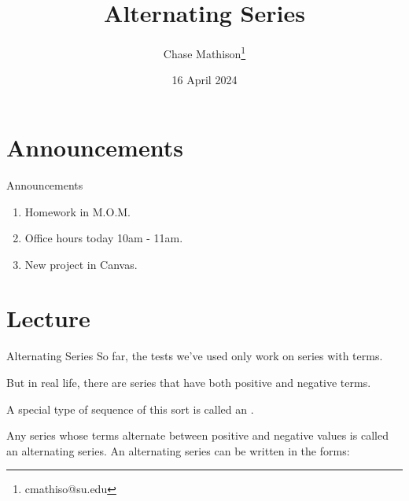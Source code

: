 \documentclass[presentation]{beamer}
\institute[SU]{Shenandoah University}
\author{Chase Mathison\thanks{cmathiso@su.edu}}
\date{16 April 2024}
\title{Alternating Series}
\begin{document}
\maketitle

\section{Announcements}
\label{sec:orgf1c827c}
\begin{frame}[label={sec:org1eadf8d}]{Announcements}
\begin{enumerate}
\item Homework in M.O.M.
\item Office hours today 10am - 11am.
\item New project in Canvas.
\end{enumerate}
\end{frame}

\section{Lecture}
\label{sec:org3dd32c7}
\begin{frame}[label={sec:orga7f09e0}]{Alternating Series}
So far, the tests we've used only work on series with \uline{\hspace*{1in}} terms.

But in real life, there are series that have both positive and negative terms.

A special type of sequence of this sort is called an \uline{\hspace*{1in}}.

\begin{definition}
Any series whose terms alternate between positive and negative values is called
an alternating series.  An alternating series can be written in the forms:
\vspace{1in}
\end{definition}
\end{frame}
\end{document}
